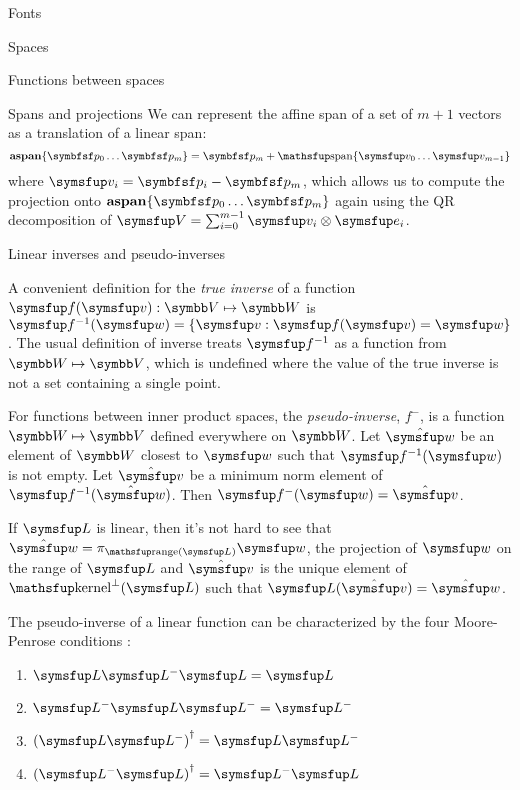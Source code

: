 \documentclass[12pt]{PalisadesLakesArticle}
\begin{document}
\begin{plSection}{Fonts}
\begin{plSection}{Spaces}
\begin{plSection}{Functions between spaces}
\begin{plSection}{Spans and projections}
We can represent the affine span of a set of $m+1$ vectors
as a translation of a linear span:
\begin{equation}
\affinespan\{ \Point{p}_0 \ldots \Point{p}_{m} \} = \Point{p}_m + \linearspan\{\Vector{v}_0 \ldots \Vector{v}_{m-1}\}
\end{equation}
where $\Vector{v}_i = \Point{p}_i - \Point{p}_m$,
which allows us to compute the projection onto
$\affinespan\{ \Point{p}_0 \ldots \Point{p}_{m} \}$
again using the QR decomposition
of $\Vector{V} = \sum_{i=0}^{m-1} \Vector{v}_i \otimes \Vector{e}_i$.

\end{plSection}%
\begin{plSection}{Linear inverses and pseudo-inverses}
\label{sec:Linear-inverses-and-pseudo-inverses}

A convenient definition for the \textit{true inverse}
of a function $\Vector{f}(\Vector{v}):\Space{V} \mapsto \Space{W}$ is
$\Vector{f}^{-1}(\Vector{w}) = \{ \Vector{v} : \Vector{f}(\Vector{v}) = \Vector{w} \}$.
The usual definition of inverse treats $\Vector{f}^{-1}$
as a function from $\Space{W} \mapsto \Space{V}$,
which is undefined where the value of the true
inverse is not a set containing a single point.

For functions between inner product spaces,
the \textit{pseudo-inverse}, $f^{-}$, is a function $\Space{W} \mapsto \Space{V}$
defined everywhere on $\Space{W}$.
Let $\hat{\Vector{w}}$ be an element of $\Space{W}$ closest to $\Vector{w}$
such that $\Vector{f}^{-1}(\Vector{w})$ is not empty.
Let $\hat{\Vector{v}}$ be a minimum norm element of $\Vector{f}^{-1}(\hat{\Vector{w}})$.
Then $\Vector{f}^{-}(\Vector{w}) = \hat{\Vector{v}}$.

If $\Vector{L}$ is linear, then it's not hard to see that
$\hat{\Vector{w}} = \pi_{\range(\Vector{L})} \Vector{w}$, the projection of $\Vector{w}$
on the range of $\Vector{L}$
and
$\hat{\Vector{v}}$ is the unique element of $\kernel^{\perp}(\Vector{L})$
such that $\Vector{L}(\hat{\Vector{v}}) = \hat{\Vector{w}}$.

The pseudo-inverse of a linear function can be characterized
by the four Moore-Penrose 
conditions :
\begin{enumerate}
\item $\Vector{L} \Vector{L}^{-} \Vector{L} = \Vector{L}$
\item $\Vector{L}^{-} \Vector{L} \Vector{L}^{-} = \Vector{L}^{-}$
\item $\left( \Vector{L} \Vector{L}^{-} \right)^{\dagger} = \Vector{L} \Vector{L}^{-}$
\item $\left( \Vector{L}^{-} \Vector{L} \right)^{\dagger} = \Vector{L}^{-} \Vector{L}$
\end{enumerate}


\end{plSection}
\end{plSection}
\end{plSection}
\end{plSection}
\end{document}
